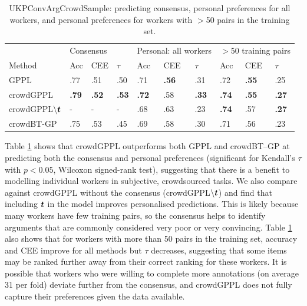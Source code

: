\begin{table}
 \centering
 \small
 \setlength{\tabcolsep}{4pt}
\begin{tabular}{ l l l l@{\hskip 1.0cm} l l l@{\hskip 1.0cm} l l l}
\hline
 & \multicolumn{3}{l}{Consensus} & 
 \multicolumn{3}{l}{Personal: all workers} &\multicolumn{3}{l}{$>$50 training pairs} \\
 Method & Acc & CEE & $\tau$ & Acc & CEE & $\tau$ & Acc & CEE & $\tau$ \\ 
  \midrule
 GPPL  & 
 .77 & .51 & .50 & 
 .71 &  \textbf{.56} & .31 & 
 .72 &  \textbf{.55} & .25 \\ %
 crowdGPPL & 
 \textbf{.79} & \textbf{.52} & \textbf{.53} & 
 \textbf{.72} & .58 & \textbf{.33} & 
 \textbf{.74} & \textbf{.55} & \textbf{.27}  \\ %
 crowdGPPL$\backslash \boldsymbol t$ & - & - & - &
.68 & .63 & .23 & \textbf{.74} & .57 & \textbf{.27} 
 \\
 crowdBT-GP & .75 & .53 & .45 & .69 & .58 & .30 & .71 & .56 & .23
 \\ \bottomrule
\end{tabular}
\caption{UKPConvArgCrowdSample: predicting consensus, personal preferences for all workers,
and personal preferences for workers with $>$50 pairs in the training set.
}
\label{tab:convarg}
\end{table}
Table \ref{tab:convarg} shows that 
crowdGPPL outperforms both GPPL and
crowdBT--GP 
at predicting both the consensus and personal preferences
(significant for Kendall's $\tau$ with $p<0.05$, Wilcoxon signed-rank test),
suggesting that there is a benefit
to modelling individual workers in subjective, crowdsourced tasks. 
We also compare against crowdGPPL without the consensus (crowdGPPL$\backslash \boldsymbol t$)
and find that including $\boldsymbol t$ in the model improves personalised
predictions. This is likely because many workers have few training pairs, 
so the consensus helps to identify arguments that are commonly considered very poor or very
convincing.
Table \ref{tab:convarg} also shows that for
workers with more than 50 pairs in the training set,
accuracy and CEE improve for all methods but
$\tau$ decreases,
suggesting that some items may be ranked further away from their correct ranking 
for these workers. It is possible that workers who were willing to complete more
annotations (on average 31 per fold)
deviate further from the consensus, and crowdGPPL does not fully capture
their preferences given the data available.

